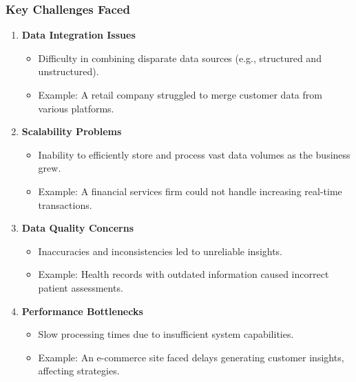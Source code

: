 \documentclass[aspectratio=169]{beamer}
\begin{document}
\begin{frame}[fragile]
    \frametitle{Key Challenges Faced}
    \begin{enumerate}
        \item \textbf{Data Integration Issues}
          \begin{itemize}
              \item Difficulty in combining disparate data sources (e.g., structured and unstructured).
              \item Example: A retail company struggled to merge customer data from various platforms.
          \end{itemize}
          
        \item \textbf{Scalability Problems}
          \begin{itemize}
              \item Inability to efficiently store and process vast data volumes as the business grew.
              \item Example: A financial services firm could not handle increasing real-time transactions.
          \end{itemize}
          
        \item \textbf{Data Quality Concerns}
          \begin{itemize}
              \item Inaccuracies and inconsistencies led to unreliable insights.
              \item Example: Health records with outdated information caused incorrect patient assessments.
          \end{itemize}
          
        \item \textbf{Performance Bottlenecks}
          \begin{itemize}
              \item Slow processing times due to insufficient system capabilities.
              \item Example: An e-commerce site faced delays generating customer insights, affecting strategies.
          \end{itemize}
    \end{enumerate}
\end{frame}
\end{document}
